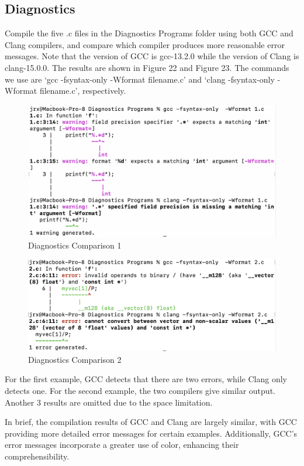 \documentclass[conference]{IEEEtran}
\begin{document}
\subsection{Diagnostics}

Compile the five .c files in the Diagnostics Programs folder using both GCC and Clang compilers, and compare which compiler produces more reasonable error messages. Note that the version of GCC is gcc-13.2.0 while the version of Clang is clang-15.0.0. The results are shown in Figure 22 and Figure 23. The commands we use are `gcc -fsyntax-only -Wformat filename.c' and `clang -fsyntax-only -Wformat filename.c', respectively.

\begin{figure}[htbp]
\centering
\includegraphics [width=0.8\linewidth]{DiagnosticsPrograms/1.png}
\caption{Diagnostics Comparison 1}
\label{fig22}
\end{figure}

\begin{figure}[htbp]
\centering
\includegraphics [width=0.8\linewidth]{DiagnosticsPrograms/2.png}
\caption{Diagnostics Comparison 2}
\label{fig23}
\end{figure}

For the first example, GCC detects that there are two errors, while Clang only detects one. For the second example, the two compilers give similar output. Another 3 results are omitted due to the space limitation.

In brief, the compilation results of GCC and Clang are largely similar, with GCC providing more detailed error messages for certain examples. Additionally, GCC's error messages incorporate a greater use of color, enhancing their comprehensibility.
\end{document}
